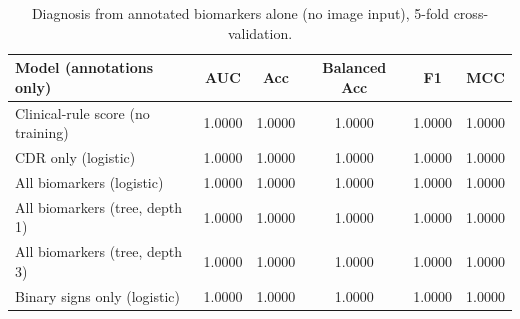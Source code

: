 \begin{table}[t]
\centering
\caption{Diagnosis from annotated biomarkers alone (no image input), 5-fold cross-validation.}
\label{tab:annonly}
\begin{tabular}{lccccc}
\toprule
Model (annotations only) & AUC & Acc & Balanced Acc & F1 & MCC \\
\midrule
Clinical-rule score (no training) & 1.0000 & 1.0000 & 1.0000 & 1.0000 & 1.0000 \\
CDR only (logistic) & 1.0000 & 1.0000 & 1.0000 & 1.0000 & 1.0000 \\
All biomarkers (logistic) & 1.0000 & 1.0000 & 1.0000 & 1.0000 & 1.0000 \\
All biomarkers (tree, depth 1) & 1.0000 & 1.0000 & 1.0000 & 1.0000 & 1.0000 \\
All biomarkers (tree, depth 3) & 1.0000 & 1.0000 & 1.0000 & 1.0000 & 1.0000 \\
Binary signs only (logistic) & 1.0000 & 1.0000 & 1.0000 & 1.0000 & 1.0000 \\
\bottomrule
\end{tabular}
\end{table}